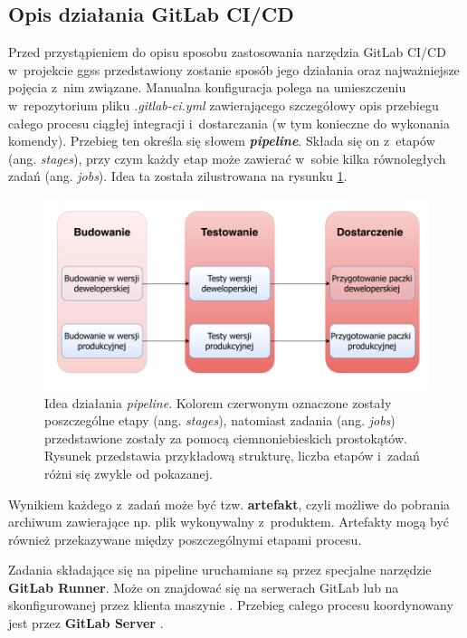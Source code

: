 \subsection{Opis działania GitLab CI/CD}
Przed przystąpieniem do opisu sposobu zastosowania narzędzia GitLab CI/CD w~projekcie \gls*{ggss} przedstawiony zostanie sposób jego działania oraz najważniejsze pojęcia z~nim związane. Manualna konfiguracja polega na umieszczeniu w~repozytorium pliku \textit{.gitlab-ci.yml} zawierającego szczegółowy opis przebiegu całego procesu ciągłej integracji i~dostarczania (w tym konieczne do wykonania komendy). Przebieg ten określa się słowem \textit{\textbf{pipeline}}. Składa się on z~etapów (ang. \textit{stages}), przy czym każdy etap może zawierać w~sobie kilka równoległych zadań (ang. \textit{jobs}). Idea ta została zilustrowana na rysunku \ref{fig:pipeline}.

\begin{figure}
\centering
\includegraphics[width=\textwidth]{res/Pipeline.pdf}
\caption{Idea działania \textit{pipeline}. Kolorem czerwonym oznaczone zostały poszczególne etapy (ang. \textit{stages}), natomiast zadania (ang. \textit{jobs}) przedstawione zostały za pomocą ciemnoniebieskich prostokątów. Rysunek przedstawia przykładową strukturę, liczba etapów i~zadań różni się zwykle od pokazanej.}
\label{fig:pipeline}
\end{figure}

Wynikiem każdego z~zadań może być tzw. \textbf{artefakt}, czyli możliwe do pobrania archiwum zawierające np. plik wykonywalny z~produktem. Artefakty mogą być również przekazywane między poszczególnymi etapami procesu. 

Zadania składające się na pipeline uruchamiane są przez specjalne narzędzie \textbf{GitLab Runner}. Może on znajdować się na serwerach GitLab lub na skonfigurowanej przez klienta maszynie \cite{CIzGitLab}. Przebieg całego procesu koordynowany jest przez \textbf{GitLab Server} \cite{GitLabPage}.

